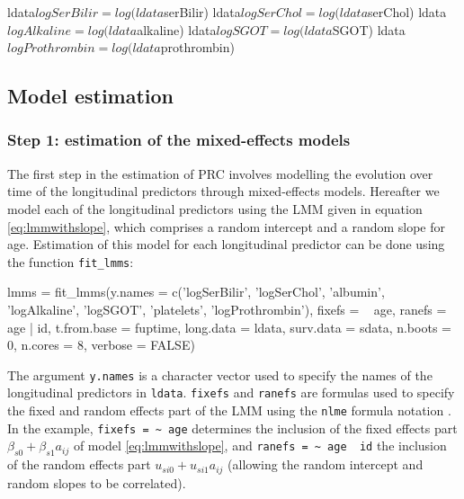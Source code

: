 \begin{Schunk}
\begin{Sinput}
ldata$logSerBilir = log(ldata$serBilir)
ldata$logSerChol = log(ldata$serChol)
ldata$logAlkaline = log(ldata$alkaline)
ldata$logSGOT = log(ldata$SGOT)
ldata$logProthrombin = log(ldata$prothrombin)
\end{Sinput}
\end{Schunk}

\subsection{Model estimation}\label{model-estimation}

\subsubsection{Step 1: estimation of the mixed-effects
models}\label{step-1-estimation-of-the-mixed-effects-models}

The first step in the estimation of PRC involves modelling the evolution
over time of the longitudinal predictors through mixed-effects models.
Hereafter we model each of the longitudinal predictors using the LMM
given in equation \eqref{eq:lmmwithslope}, which comprises a random
intercept and a random slope for age. Estimation of this model for each
longitudinal predictor can be done using the function
\texttt{fit\_lmms}:

\begin{Schunk}
\begin{Sinput}
lmms = fit_lmms(y.names = c('logSerBilir', 'logSerChol', 'albumin', 'logAlkaline',
                            'logSGOT', 'platelets', 'logProthrombin'), 
                fixefs = ~ age, ranefs = ~ age | id, t.from.base = fuptime,
                long.data = ldata, surv.data = sdata, n.boots = 0, n.cores = 8, 
                verbose = FALSE)
\end{Sinput}
\end{Schunk}

The argument \texttt{y.names} is a character vector used to specify the
names of the longitudinal predictors in \texttt{ldata}. \texttt{fixefs}
and \texttt{ranefs} are formulas used to specify the fixed and random
effects part of the LMM using the \texttt{nlme} formula notation
\citep{pinheiro2022, galecki2013}. In the example,
\texttt{fixefs\ =\ \textasciitilde{}\ age} determines the inclusion of
the fixed effects part \(\beta_{s0} + \beta_{s1} a_{ij}\) of model
\eqref{eq:lmmwithslope}, and
\texttt{ranefs\ =\ \textasciitilde{}\ age\ \textbar{}\ id} the inclusion
of the random effects part \(u_{si0} + u_{si1} a_{ij}\) (allowing the
random intercept and random slopes to be correlated).

